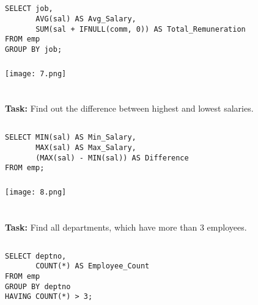 \documentclass[12pt,a4paper]{article}
\begin{document}
\subsection{}
\begin{lstlisting}
SELECT job,
       AVG(sal) AS Avg_Salary,
       SUM(sal + IFNULL(comm, 0)) AS Total_Remuneration
FROM emp
GROUP BY job;
\end{lstlisting}

\subsubsection{}
\begin{center}
    \texttt{[image: 7.png]}
\end{center}


\section{}
\textbf{Task:} Find out the difference between highest and lowest salaries.

\subsection{}
\begin{lstlisting}
SELECT MIN(sal) AS Min_Salary,
       MAX(sal) AS Max_Salary,
       (MAX(sal) - MIN(sal)) AS Difference
FROM emp;
\end{lstlisting}

\subsubsection{}
\begin{center}
    \texttt{[image: 8.png]}
\end{center}


\section{}
\textbf{Task:} Find all departments, which have more than 3 employees.

\subsection{}
\begin{lstlisting}
SELECT deptno,
       COUNT(*) AS Employee_Count
FROM emp
GROUP BY deptno
HAVING COUNT(*) > 3;
\end{lstlisting}
\end{document}
